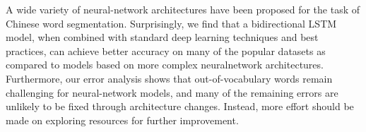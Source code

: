 A wide variety of neural-network architectures have been proposed for the task of Chinese word segmentation. Surprisingly, we find that a bidirectional LSTM model, when combined with standard deep learning techniques and best practices, can achieve better accuracy on many of the popular datasets as compared to models based on more complex neuralnetwork architectures. Furthermore, our error analysis shows that out-of-vocabulary words remain challenging for neural-network models, and many of the remaining errors are unlikely to be fixed through architecture changes. Instead, more effort should be made on exploring resources for further improvement.
